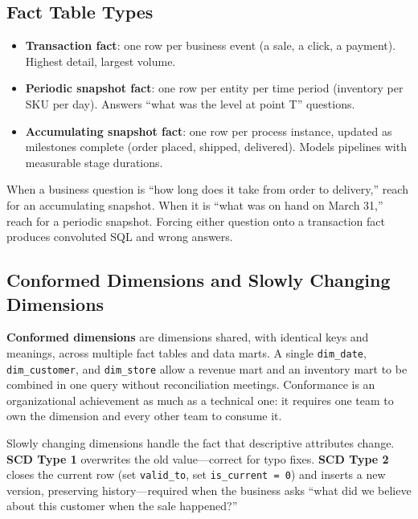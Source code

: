 \subsection{Fact Table Types}
\begin{itemize}
    \item \textbf{Transaction fact}: one row per business event (a sale, a click, a payment). Highest detail, largest volume.
    \item \textbf{Periodic snapshot fact}: one row per entity per time period (inventory per SKU per day). Answers ``what was the level at point T'' questions.
    \item \textbf{Accumulating snapshot fact}: one row per process instance, updated as milestones complete (order placed, shipped, delivered). Models pipelines with measurable stage durations.
\end{itemize}

\begin{tipbox}
When a business question is ``how long does it take from order to delivery,'' reach for an accumulating snapshot. When it is ``what was on hand on March 31,'' reach for a periodic snapshot. Forcing either question onto a transaction fact produces convoluted SQL and wrong answers.
\end{tipbox}

\subsection{Conformed Dimensions and Slowly Changing Dimensions}
\textbf{Conformed dimensions} are dimensions shared, with identical keys and meanings, across multiple fact tables and data marts. A single \texttt{dim\_date}, \texttt{dim\_customer}, and \texttt{dim\_store} allow a revenue mart and an inventory mart to be combined in one query without reconciliation meetings. Conformance is an organizational achievement as much as a technical one: it requires one team to own the dimension and every other team to consume it.

Slowly changing dimensions handle the fact that descriptive attributes change. \textbf{SCD Type 1} overwrites the old value---correct for typo fixes. \textbf{SCD Type 2} closes the current row (set \texttt{valid\_to}, set \texttt{is\_current = 0}) and inserts a new version, preserving history---required when the business asks ``what did we believe about this customer when the sale happened?''

